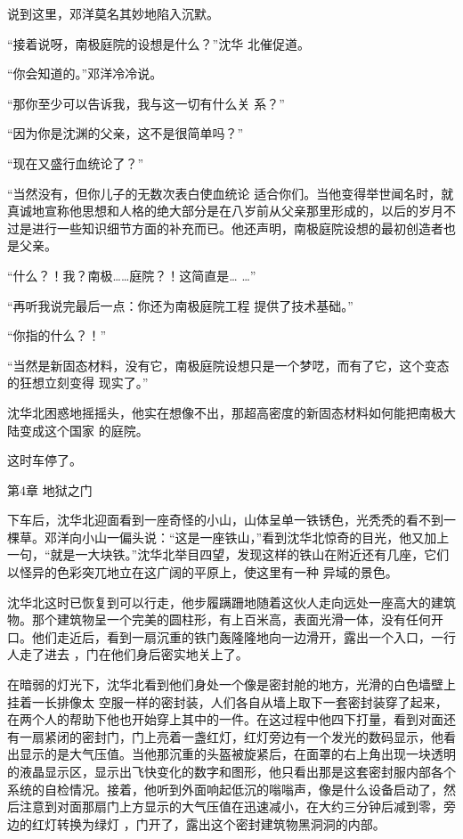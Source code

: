 \documentclass{article}
\begin{document}
说到这里，邓洋莫名其妙地陷入沉默。 

“接着说呀，南极庭院的设想是什么？”沈华
北催促道。 


“你会知道的。”邓洋冷冷说。 

“那你至少可以告诉我，我与这一切有什么关
系？” 

“因为你是沈渊的父亲，这不是很简单吗？”


“现在又盛行血统论了？” 

“当然没有，但你儿子的无数次表白使血统论
\newpage
适合你们。当他变得举世闻名时，就真诚地宣称他思想和人格的绝大部分是在八岁前从父亲那里形成的，以后的岁月不过是进行一些知识细节方面的补充而已。他还声明，南极庭院设想的最初创造者也是父亲。

“什么？！我？南极……庭院？！这简直是…
…” 

“再听我说完最后一点：你还为南极庭院工程
提供了技术基础。” 


“你指的什么？！” 

“当然是新固态材料，没有它，南极庭院设想只是一个梦呓，而有了它，这个变态的狂想立刻变得
现实了。” 

沈华北困惑地摇摇头，他实在想像不出，那超高密度的新固态材料如何能把南极大陆变成这个国家
的庭院。 

\newpage


这时车停了。 


第4章 地狱之门 

下车后，沈华北迎面看到一座奇怪的小山，山体呈单一铁锈色，光秃秃的看不到一棵草。邓洋向小山一偏头说：“这是一座铁山，”看到沈华北惊奇的目光，他又加上一句，“就是一大块铁。”沈华北举目四望，发现这样的铁山在附近还有几座，它们以怪异的色彩突兀地立在这广阔的平原上，使这里有一种
异域的景色。 

沈华北这时已恢复到可以行走，他步履蹒跚地随着这伙人走向远处一座高大的建筑物。那个建筑物呈一个完美的圆柱形，有上百米高，表面光滑一体，没有任何开口。他们走近后，看到一扇沉重的铁门轰隆隆地向一边滑开，露出一个入口，一行人走了进去
，门在他们身后密实地关上了。 

在暗弱的灯光下，沈华北看到他们身处一个像是密封舱的地方，光滑的白色墙壁上挂着一长排像太
\newpage
空服一样的密封装，人们各自从墙上取下一套密封装穿了起来，在两个人的帮助下他也开始穿上其中的一件。在这过程中他四下打量，看到对面还有一扇紧闭的密封门，门上亮着一盏红灯，红灯旁边有一个发光的数码显示，他看出显示的是大气压值。当他那沉重的头盔被旋紧后，在面罩的右上角出现一块透明的液晶显示区，显示出飞快变化的数字和图形，他只看出那是这套密封服内部各个系统的自检情况。接着，他听到外面响起低沉的嗡嗡声，像是什么设备启动了，然后注意到对面那扇门上方显示的大气压值在迅速减小，在大约三分钟后减到零，旁边的红灯转换为绿灯
，门开了，露出这个密封建筑物黑洞洞的内部。 
\end{document}
